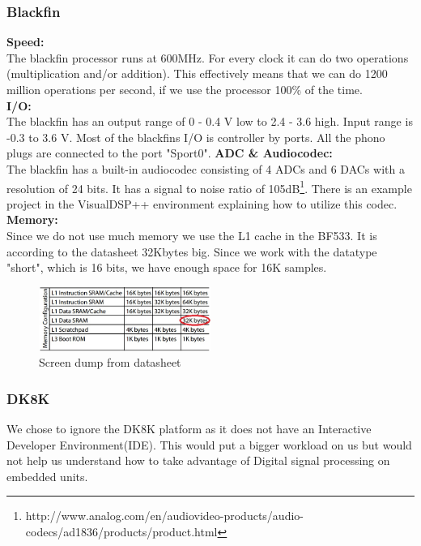 \subsubsection{Blackfin}
\textbf{Speed:}\\
The blackfin processor runs at 600MHz. For every clock it can do two operations (multiplication and/or addition). This effectively means that we can do 1200 million operations per second, if we use the processor 100\% of the time.\\
\textbf{I/O:}\\
The blackfin has an output range of 0 - 0.4 V low to 2.4 - 3.6 high. Input range is -0.3 to 3.6 V. Most of the blackfins I/O is controller by ports. All the phono plugs are connected to the port "Sport0". 
\textbf{ADC \& Audiocodec:}\\
The blackfin has a built-in audiocodec consisting of 4 ADCs and 6 DACs with a resolution of 24 bits. It has a signal to noise ratio of 105dB\footnote{http://www.analog.com/en/audiovideo-products/audio-codecs/ad1836/products/product.html}. There is an example project in the VisualDSP++ environment explaining how to utilize this codec.\\
\textbf{Memory:}\\
Since we do not use much memory we use the L1 cache in the BF533. It is according to the datasheet 32Kbytes big. Since we work with the datatype "short", which is 16 bits, we have enough space for 16K samples.\\
\begin{figure}[hbpt]
\centering
\includegraphics[width=0.5\textwidth]{billeder/memorytable}
\caption[Screen dump from datasheet]{Screen dump from datasheet\footnotemark}
\label{img:mem_table}
\end{figure}
\subsubsection{DK8K}
We chose to ignore the DK8K platform as it does not have an Interactive Developer Environment(IDE). This would put a bigger workload on us but would not help us understand how to take advantage of Digital signal processing on embedded units.
